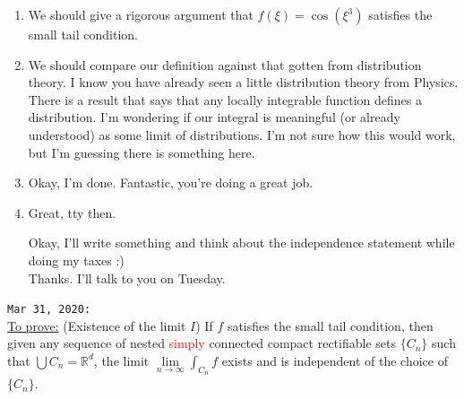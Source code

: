 \documentclass{article}
\theoremstyle{definition}
\begin{document}
\begin{framed}
\begin{enumerate}
\item We should give a rigorous argument that $f(\xi)=\cos(\xi^3)$ satisfies the small tail condition. 

\item We should compare our definition against that gotten from distribution theory. I know you have already seen a little distribution theory from Physics. There is a result that says that any locally integrable function defines a distribution. I'm wondering if our integral is meaningful (or already understood) as some limit of distributions. I'm not sure how this would work, but I'm guessing there is something here. 

\item Okay, I'm done. Fantastic, you're doing a great job. 

\item Great, tty then.

Okay, I'll write something and think about the independence statement while doing my taxes :) \\

Thanks. I'll talk to you on Tuesday.

\end{enumerate}
\end{framed}














\noindent \texttt{Mar 31, 2020:} \\

\noindent \underline{To prove:} (Existence of the limit $I$) If $f$ satisfies the small tail condition, then given any sequence of nested \textcolor{red}{simply} connected compact rectifiable sets $\{C_n\}$ such that $\bigcup C_n = \mathbb{R}^d$, the limit $\lim\limits_{n\to\infty}\int_{C_n}f$ exists and is independent of the choice of $\{ C_n \}$. \\
\end{document}

